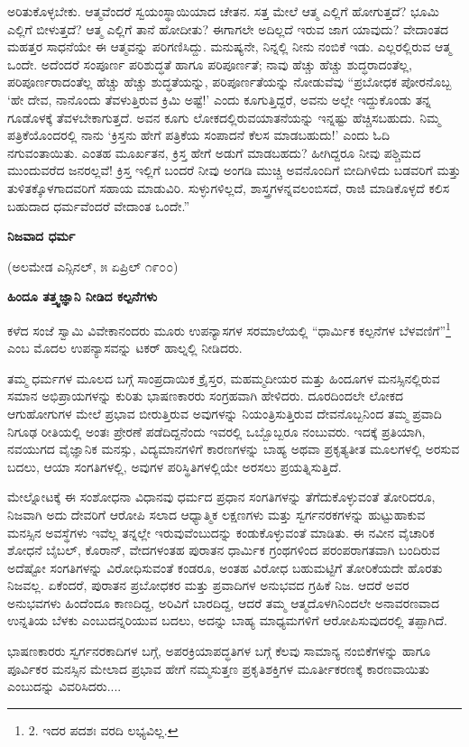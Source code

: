 ಅರಿತುಕೊಳ್ಳಬೇಕು. ಆತ್ಮವೆಂದರೆ ಸ್ವಯಂಸ್ಥಾಯಿಯಾದ ಚೇತನ. ಸತ್ತ ಮೇಲೆ ಆತ್ಮ ಎಲ್ಲಿಗೆ ಹೋಗುತ್ತದೆ? ಭೂಮಿ ಎಲ್ಲಿಗೆ ಬೀಳುತ್ತದೆ? ಆತ್ಮ ಎಲ್ಲಿಗೆ ತಾನೆ ಹೋದೀತು? ಈಗಾಗಲೇ ಅದಿಲ್ಲದೆ ಇರುವ ಜಾಗ ಯಾವುದು? ವೇದಾಂತದ ಮಹತ್ತರ ಸಾಧನೆಯೇ ಈ ಆತ್ಮವನ್ನು ಪರಿಗಣಿಸಿದ್ದು. ಮನುಷ್ಯನೇ, ನಿನ್ನಲ್ಲಿ ನೀನು ನಂಬಿಕೆ ಇಡು. ಎಲ್ಲರಲ್ಲಿರುವ ಆತ್ಮ ಒಂದೇ. ಅದೆಂದರೆ ಸಂಪೂರ್ಣ ಪರಿಶುದ್ಧತೆ ಹಾಗೂ ಪರಿಪೂರ್ಣತೆ; ನಾವು ಹೆಚ್ಚು ಹೆಚ್ಚು ಶುದ್ಧರಾದಂತೆಲ್ಲ, ಪರಿಪೂರ್ಣರಾದಂತೆಲ್ಲ ಹೆಚ್ಚು ಹೆಚ್ಚು ಶುದ್ಧತೆಯನ್ನು, ಪರಿಪೂರ್ಣತೆಯನ್ನು ನೋಡುವೆವು “ಪ್ರಬೋಧಕ ಪೋರನೊಬ್ಬ ‘ಹೇ ದೇವ, ನಾನೊಂದು ತೆವಳುತ್ತಿರುವ ಕ್ರಿಮಿ ಅಷ್ಟೆ!’ ಎಂದು ಕೂಗುತ್ತಿದ್ದರೆ, ಅವನು ಅಲ್ಲೇ ಇದ್ದುಕೊಂಡು ತನ್ನ ಗೂಡೊಳಕ್ಕೆ ತೆವಳಬೇಕಾಗುತ್ತದೆ. ಅವನ ಕೂಗು ಲೋಕದಲ್ಲಿರುವಯಾತನೆಯನ್ನು ಇನ್ನಷ್ಟು ಹೆಚ್ಚಿಸಬಹುದು. ನಿಮ್ಮ ಪತ್ರಿಕೆಯೊಂದರಲ್ಲಿ ನಾನು ‘ಕ್ರಿಸ್ತನು ಹೇಗೆ ಪತ್ರಿಕೆಯ ಸಂಪಾದನೆ ಕೆಲಸ ಮಾಡಬಹುದು!’ ಎಂದು ಓದಿ ನಗುವಂತಾಯಿತು. ಎಂತಹ ಮೂರ್ಖತನ, ಕ್ರಿಸ್ತ ಹೇಗೆ ಅಡುಗೆ ಮಾಡಬಹದು? ಹೀಗಿದ್ದರೂ ನೀವು ಪಶ್ಚಿಮದ ಮುಂದುವರೆದ ಜನರಲ್ಲವೆ! ಕ್ರಿಸ್ತ ಇಲ್ಲಿಗೆ ಬಂದರೆ ನೀವು ಅಂಗಡಿ ಮುಚ್ಚಿ ಅವನೊಂದಿಗೆ ಬೀದಿಗಿಳಿದು ಬಡವರಿಗೆ ಮತ್ತು ತುಳಿತಕ್ಕೊಳಗಾದವರಿಗೆ ಸಹಾಯ ಮಾಡುವಿರಿ. ಸುಳ್ಳುಗಳಿಲ್ಲದೆ, ಶಾಸ್ತ್ರಗಳನ್ನವಲಂಬಿಸದೆ, ರಾಜಿ ಮಾಡಿಕೊಳ್ಳದೆ ಕಲಿಸ ಬಹುದಾದ ಧರ್ಮವೆಂದರೆ ವೇದಾಂತ ಒಂದೇ.”

\begin{center}
\textbf{ನಿಜವಾದ ಧರ್ಮ}
\end{center}

\begin{center}
(ಅಲಮೇಡ ಎನ್ಸಿನಲ್, ೫ ಏಪ್ರಿಲ್ ೧೯೦೦)
\end{center}

\begin{center}
\textbf{ಹಿಂದೂ ತತ್ತ್ವಜ್ಞಾನಿ ನೀಡಿದ ಕಲ್ಪನೆಗಳು}
\end{center}

ಕಳೆದ ಸಂಜೆ ಸ್ವಾಮಿ ವಿವೇಕಾನಂದರು ಮೂರು ಉಪನ್ಯಾಸಗಳ ಸರಮಾಲೆಯಲ್ಲಿ “ಧಾರ್ಮಿಕ ಕಲ್ಪನೆಗಳ ಬೆಳವಣಿಗೆ”\footnote{2. ಇದರ ಪದಶಃ ವರದಿ ಲಭ್ಯವಿಲ್ಲ.} ಎಂಬ ಮೊದಲ ಉಪನ್ಯಾಸವನ್ನು ಟಕರ್ ಹಾಲ್ನಲ್ಲಿ ನೀಡಿದರು.

ತಮ್ಮ ಧರ್ಮಗಳ ಮೂಲದ ಬಗ್ಗೆ ಸಾಂಪ್ರದಾಯಿಕ ಕ್ರೈಸ್ತರ, ಮಹಮ್ಮದೀಯರ ಮತ್ತು ಹಿಂದೂಗಳ ಮನಸ್ಸಿನಲ್ಲಿರುವ ಸಮಾನ ಅಭಿಪ್ರಾಯಗಳನ್ನು ಕುರಿತು ಭಾಷಣಕಾರರು ಸಂಗ್ರಹವಾಗಿ ಹೇಳಿದರು. ದೂರದಿಂದಲೇ ಲೋಕದ ಆಗುಹೋಗುಗಳ ಮೇಲೆ ಪ್ರಭಾವ ಬೀರುತ್ತಿರುವ ಅವುಗಳನ್ನು ನಿಯಂತ್ರಿಸುತ್ತಿರುವ ದೇವನೊಬ್ಬನಿಂದ ತಮ್ಮ ಪ್ರವಾದಿ ನಿಗೂಢ ರೀತಿಯಲ್ಲಿ ಅಂತಃ ಪ್ರೇರಣೆ ಪಡೆದಿದ್ದನೆಂದು ಇವರಲ್ಲಿ ಒಬ್ಬೊಬ್ಬರೂ ನಂಬುವರು. ಇದಕ್ಕೆ ಪ್ರತಿಯಾಗಿ, ನವಯುಗದ ವೈಜ್ಞಾನಿಕ ಮನಸ್ಸು, ವಿದ್ಯಮಾನಗಳಿಗೆ ಕಾರಣಗಳನ್ನು ಬಾಹ್ಯ ಅಥವಾ ಪ್ರಕೃತ್ಯತೀತ ಮೂಲಗಳಲ್ಲಿ ಅರಸುವ ಬದಲು, ಆಯಾ ಸಂಗತಿಗಳಲ್ಲಿ, ಅವುಗಳ ಪರಿಸ್ಥಿತಿಗಳಲ್ಲಿಯೇ ಅರಸಲು ಪ್ರಯತ್ನಿಸುತ್ತಿದೆ.

ಮೇಲ್ನೋಟಕ್ಕೆ ಈ ಸಂಶೋಧನಾ ವಿಧಾನವು ಧರ್ಮದ ಪ್ರಧಾನ ಸಂಗತಿಗಳನ್ನು ತೆಗೆದುಕೊಳ್ಳುವಂತೆ ತೋರಿದರೂ, ನಿಜವಾಗಿ ಅದು ದೇವರಿಗೆ ಆರೋಪಿ ಸಲಾದ ಆಧ್ಯಾತ್ಮಿಕ ಲಕ್ಷಣಗಳು ಮತ್ತು ಸ್ವರ್ಗನರಕಗಳನ್ನು ಹುಟ್ಟುಹಾಕುವ ಮನಸ್ಸಿನ ಅವಸ್ಥೆಗಳು ಇವೆಲ್ಲ ತನ್ನಲ್ಲೇ ಇರುವುವೆಂಬುದನ್ನು ಕಂಡುಕೊಳ್ಳುವಂತೆ ಮಾಡಿತು. ಈ ನವೀನ ವೈಚಾರಿಕ ಶೋಧನೆ ಬೈಬಲ್, ಕೊರಾನ್, ವೇದಗಳಂತಹ ಪುರಾತನ ಧಾರ್ಮಿಕ ಗ್ರಂಥಗಳಿಂದ ಪರಂಪರಾಗತವಾಗಿ ಬಂದಿರುವ ಅದೆಷ್ಟೋ ಸಂಗತಿಗಳನ್ನು ವಿರೋಧಿಸುವಂತೆ ಕಂಡರೂ, ಅಂತಹ ವಿರೋಧ ಬಹುಮಟ್ಟಿಗೆ ತೋರಿಕೆಯದೇ ಹೊರತು ನಿಜವಲ್ಲ. ಏಕೆಂದರೆ, ಪುರಾತನ ಪ್ರಬೋಧಕರ ಮತ್ತು ಪ್ರವಾದಿಗಳ ಅನುಭವದ ಗ್ರಹಿಕೆ ನಿಜ. ಆದರೆ ಅವರ ಅನುಭವಗಳು ಹಿಂದೆಂದೂ ಕಾಣದಿದ್ದ, ಅರಿವಿಗೆ ಬಾರದಿದ್ದ, ಆದರೆ ತಮ್ಮ ಆತ್ಮದೊಳಗಿನಿಂದಲೇ ಅನಾವರಣವಾದ ಉನ್ನತಿಯ ಬೆಳಕು ಎಂಬುದನ್ನರಿಯುವ ಬದಲು, ಅದನ್ನು ಬಾಹ್ಯ ಮಾಧ್ಯಮಗಳಿಗೆ ಆರೋಪಿಸುವುದರಲ್ಲಿ ತಪ್ಪಾಗಿದೆ.

ಭಾಷಣಕಾರರು ಸ್ವರ್ಗನರಕಾದಿಗಳ ಬಗ್ಗೆ, ಅಪರಕ್ರಿಯಾಪದ್ಧತಿಗಳ ಬಗ್ಗೆ ಕೆಲವು ಸಾಮಾನ್ಯ ನಂಬಿಕೆಗಳನ್ನು ಹಾಗೂ ಪೂರ್ವಿಕರ ಮನಸ್ಸಿನ ಮೇಲಾದ ಪ್ರಭಾವ ಹೇಗೆ ನಮ್ಮಸುತ್ತಣ ಪ್ರಕೃತಿಶಕ್ತಿಗಳ ಮೂರ್ತೀಕರಣಕ್ಕೆ ಕಾರಣವಾಯಿತು ಎಂಬುದನ್ನು ವಿವರಿಸಿದರು....


